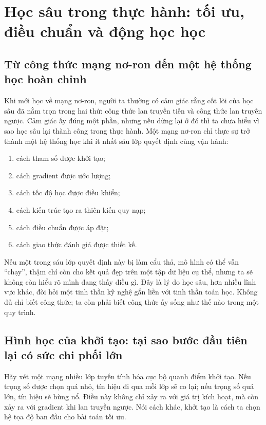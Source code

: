 \chapter{Học sâu trong thực hành: tối ưu, điều chuẩn và động học học}

\section{Từ công thức mạng nơ-ron đến một hệ thống học hoàn chỉnh}

Khi mới học về mạng nơ-ron, người ta thường có cảm giác rằng cốt lõi của học sâu đã nằm trọn trong hai thứ: công thức lan truyền tiến và công thức lan truyền ngược. Cảm giác ấy đúng một phần, nhưng nếu dừng lại ở đó thì ta chưa hiểu vì sao học sâu lại thành công trong thực hành. Một mạng nơ-ron chỉ thực sự trở thành một hệ thống học khi ít nhất sáu lớp quyết định cùng vận hành:

\begin{enumerate}
\item cách tham số được khởi tạo;
\item cách gradient được ước lượng;
\item cách tốc độ học được điều khiển;
\item cách kiến trúc tạo ra thiên kiến quy nạp;
\item cách điều chuẩn được áp đặt;
\item cách giao thức đánh giá được thiết kế.
\end{enumerate}

Nếu một trong sáu lớp quyết định này bị làm cẩu thả, mô hình có thể vẫn ``chạy'', thậm chí còn cho kết quả đẹp trên một tập dữ liệu cụ thể, nhưng ta sẽ không còn hiểu rõ mình đang thấy điều gì. Đây là lý do học sâu, hơn nhiều lĩnh vực khác, đòi hỏi một tinh thần kỹ nghệ gắn liền với tinh thần toán học. Không đủ chỉ biết công thức; ta còn phải biết công thức ấy sống như thế nào trong một quy trình.

\section{Hình học của khởi tạo: tại sao bước đầu tiên lại có sức chi phối lớn}

Hãy xét một mạng nhiều lớp tuyến tính hóa cục bộ quanh điểm khởi tạo. Nếu trọng số được chọn quá nhỏ, tín hiệu đi qua mỗi lớp sẽ co lại; nếu trọng số quá lớn, tín hiệu sẽ bùng nổ. Điều này không chỉ xảy ra với giá trị kích hoạt, mà còn xảy ra với gradient khi lan truyền ngược. Nói cách khác, khởi tạo là cách ta chọn hệ tọa độ ban đầu cho bài toán tối ưu.

